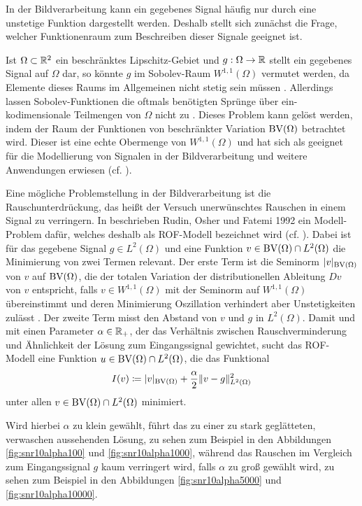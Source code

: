 In der Bildverarbeitung kann ein gegebenes Signal häufig nur durch eine
unstetige Funktion dargestellt werden. Deshalb stellt sich zunächst die Frage,
welcher Funktionenraum zum Beschreiben dieser Signale geeignet ist.

Ist $\Omega\subset\mathbb{R}^2$ ein beschränktes Lipschitz-Gebiet und $g:\Omega\to
\mathbb{R}$ stellt ein gegebenes Signal auf $\Omega$ dar, so könnte $g$ im
Sobolev-Raum $W^{1,1}(\Omega)$ vermutet werden, da Elemente dieses Raums im
Allgemeinen nicht stetig sein müssen \cite[297]{Bar15}. 
Allerdings lassen Sobolev-Funktionen die oftmals benötigten Sprünge über
ein-kodimensionale Teilmengen von $\Omega$ nicht zu \cite[393]{ABM14}.
Dieses Problem kann gelöst werden, indem der Raum der Funktionen von
beschränkter Variation $\textup{BV}(\Omega)$ betrachtet wird. Dieser ist eine echte
Obermenge von $W^{1,1}(\Omega)$ und hat sich als geeignet für die Modellierung 
von Signalen in der Bildverarbeitung und weitere Anwendungen erwiesen (cf.
\cites[393]{ABM14}[42]{AK06}[297]{Bar15}[S. 1 f.]{Bra98}).

Eine mögliche Problemstellung in der Bildverarbeitung ist die 
Rauschunterdrück\-ung, das heißt der Versuch unerwünschtes Rauschen in einem
Signal zu verringern.
In \cite{ROF92} beschrieben Rudin, Osher und Fatemi 1992 ein
Modell-Problem dafür, welches deshalb als ROF-Modell bezeichnet wird (cf.
\cites[1217]{Bar15a}[132]{CP10}[S. 74 f.]{Get12}).
Dabei ist für das gegebene Signal $g\in L^2(\Omega)$ und 
eine Funktion $v\in\textup{BV}(\Omega)\cap L^2(\Omega)$ die Minimierung
von zwei Termen relevant.
Der erste Term ist die
Seminorm $|v|_{\textup{BV}(\Omega)}$ von $v$ auf $\textup{BV}(\Omega)$, die der
totalen Variation der distributionellen Ableitung $Dv$ von $v$ entspricht,
falls $v\in W^{1,1}(\Omega)$ mit der Seminorm auf $W^{1,1}(\Omega)$
übereinstimmt und deren Minimierung Oszillation verhindert aber Unstetigkeiten
zulässt \cite[72]{Get12}. Der zweite Term misst den Abstand von $v$ und $g$ in 
$L^2(\Omega)$.
Damit und mit einen Parameter
$\alpha\in\mathbb{R}_+$, der das Verhältnis zwischen Rauschverminderung und
Ähnlichkeit der Lösung zum Eingangssignal gewichtet, sucht das ROF-Modell
eine Funktion $u\in\textup{BV}(\Omega)\cap L^2(\Omega)$, die das Funktional
\begin{align*}
  I(v)\coloneqq |v|_{\textup{BV}(\Omega)}+\frac{\alpha}{2}\Vert
  v-g\Vert_{L^2(\Omega)}^2
\end{align*}
unter allen $v\in\textup{BV}(\Omega)\cap L^2(\Omega)$ minimiert.

Wird hierbei $\alpha$ zu klein gewählt, führt das zu einer zu stark
geglätteten, verwaschen aussehenden Lösung, zu sehen zum Beispiel in den
Abbildungen \ref{fig:snr10alpha100} und \ref{fig:snr10alpha1000}, während das
Rauschen im Vergleich zum Eingangssignal $g$ kaum verringert wird, falls
$\alpha$ zu groß gewählt wird, zu sehen zum Beispiel in den Abbildungen
\ref{fig:snr10alpha5000} und \ref{fig:snr10alpha10000}.

